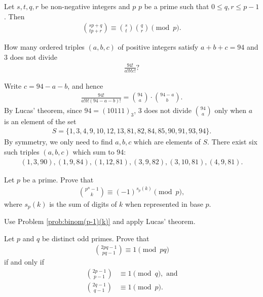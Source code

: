 \documentclass[12pt]{subfile}
\begin{document}
	\begin{corollary}
		Let $s,t,q,r$ be non-negative integers and $p$ $p$ be a prime such that $0 \leq q,r \leq p-1$. Then
		\begin{align*}
		\binom{sp+q}{tp+r} \equiv \binom{s}{t} \binom{q}{r} \pmod p.
		\end{align*}
	\end{corollary}
	
	\begin{problem}
		How many ordered triples $(a,b,c)$ of positive integers satisfy $a+b+c=94$ and $3$ does not divide
			\begin{align*}
				\frac{94!}{a!b!c!}?
			\end{align*}
	\end{problem}
	
	\begin{solution}
		Write $c=94-a-b$, and hence
			\begin{align*}
				\frac{94!}{a!b!(94 - a - b)!} = \binom{94}{a} \cdot \binom{94 - a}{b}.
			\end{align*}
		By Lucas' theorem, since $94=(10111)_3$, $3$ does not divide $\binom{94}{a}$ only when $a$ is an element of the set
			\begin{align*}
				 S= \{1, 3, 4, 9, 10, 12, 13, 81, 82, 84, 85, 90, 91, 93, 94\}.
			\end{align*}
		By symmetry, we only need to find $a,b,c$ which are elements of $S$. There exist six such triples $(a,b,c)$ which sum to $94$:
			\begin{align*}
				(1,3,90), (1, 9, 84), (1, 12, 81), (3, 9, 82), (3, 10, 81), (4,9,81).
			\end{align*}
	\end{solution}
	
	\begin{problem}
		Let $p$ be a prime. Prove that
			\begin{align*}
				\binom{p^n-1}{k}\equiv (-1)^{s_p(k)}\pmod p,
			\end{align*}
		where $s_p(k)$ is the sum of digits of $k$ when represented in base $p$.
	\end{problem}
	
	\begin{hint}
		Use Problem \ref{prob:binom(p-1)(k)} and apply Lucas' theorem.
	\end{hint}
	
	\begin{problem}
		Let $p$ and $q$ be distinct odd primes. Prove that
			\begin{align*}
				\binom{2pq-1}{pq-1}\equiv 1\pmod{pq}
			\end{align*}
		if and only if
			\begin{align*}
				\binom{2p-1}{p-1} &\equiv 1 \pmod q, \text{ and}\\
				\binom{2q-1}{q-1} &\equiv 1 \pmod p.
			\end{align*}
	\end{problem}
	
\end{document}
